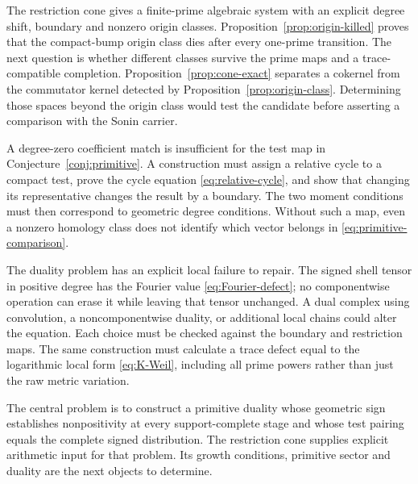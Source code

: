 \documentclass[11pt,letterpaper]{article}
\theoremstyle{definition}
\theoremstyle{remark}
\begin{document}
The restriction cone gives a finite-prime algebraic system with
an explicit degree shift, boundary and nonzero origin classes.
Proposition~\ref{prop:origin-killed} proves that the compact-bump
origin class dies after every one-prime transition. The next
question is whether different classes survive the prime maps
and a trace-compatible completion.
Proposition~\ref{prop:cone-exact} separates a cokernel from the
commutator kernel detected by Proposition~\ref{prop:origin-class}.
Determining those spaces beyond the origin class would test the
candidate before asserting a comparison with the Sonin carrier.

A degree-zero coefficient match is insufficient for the test
map in Conjecture~\ref{conj:primitive}. A construction must
assign a relative cycle to a compact test, prove the cycle
equation \eqref{eq:relative-cycle}, and show that changing its
representative changes the result by a boundary. The two
moment conditions must then correspond to geometric degree
conditions. Without such a map, even a nonzero homology class
does not identify which vector belongs in
\eqref{eq:primitive-comparison}.

The duality problem has an explicit local failure to repair.
The signed shell tensor in positive degree has the Fourier
value \eqref{eq:Fourier-defect}; no componentwise operation
can erase it while leaving that tensor unchanged. A dual
complex using convolution, a noncomponentwise duality, or
additional local chains could alter the equation. Each choice
must be checked against the boundary and restriction maps.
The same construction must calculate a trace defect equal to
the logarithmic local form \eqref{eq:K-Weil}, including all
prime powers rather than just the raw metric variation.

The central problem is to construct a primitive duality whose
geometric sign establishes nonpositivity at every support-complete
stage and whose test pairing equals the complete signed
distribution. The restriction cone supplies explicit arithmetic
input for that problem. Its growth conditions, primitive sector
and duality are the next objects to determine.
\end{document}

